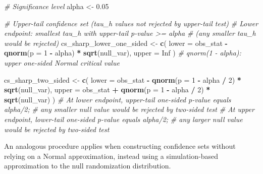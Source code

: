 \documentclass[
  12pt,
  leqno]{article}
\newenvironment{Shaded}{\begin{snugshade}}{\end{snugshade}}
\newcommand{\AttributeTok}[1]{\textcolor[rgb]{0.13,0.29,0.53}{#1}}
\newcommand{\CommentTok}[1]{\textcolor[rgb]{0.56,0.35,0.01}{\textit{#1}}}
\newcommand{\ConstantTok}[1]{\textcolor[rgb]{0.56,0.35,0.01}{#1}}
\newcommand{\DecValTok}[1]{\textcolor[rgb]{0.00,0.00,0.81}{#1}}
\newcommand{\FloatTok}[1]{\textcolor[rgb]{0.00,0.00,0.81}{#1}}
\newcommand{\FunctionTok}[1]{\textcolor[rgb]{0.13,0.29,0.53}{\textbf{#1}}}
\newcommand{\NormalTok}[1]{#1}
\newcommand{\OtherTok}[1]{\textcolor[rgb]{0.56,0.35,0.01}{#1}}
\newcommand{\SpecialCharTok}[1]{\textcolor[rgb]{0.81,0.36,0.00}{\textbf{#1}}}
\begin{document}
\singlespacing

\begin{Shaded}
\begin{Highlighting}[]
\CommentTok{\# Significance level}
\NormalTok{alpha }\OtherTok{\textless{}{-}} \FloatTok{0.05}

\CommentTok{\# Upper{-}tail confidence set (tau\_h values not rejected by upper{-}tail test)}
\CommentTok{\# Lower endpoint: smallest tau\_h with upper{-}tail p{-}value \textgreater{}= alpha}
\CommentTok{\# (any smaller tau\_h would be rejected)}
\NormalTok{cs\_sharp\_lower\_one\_sided }\OtherTok{\textless{}{-}} \FunctionTok{c}\NormalTok{(}
  \AttributeTok{lower =}\NormalTok{ obs\_stat }\SpecialCharTok{{-}} \FunctionTok{qnorm}\NormalTok{(}\AttributeTok{p =} \DecValTok{1} \SpecialCharTok{{-}}\NormalTok{ alpha) }\SpecialCharTok{*} \FunctionTok{sqrt}\NormalTok{(null\_var),}
  \AttributeTok{upper =} \ConstantTok{Inf}
\NormalTok{)}
\CommentTok{\# qnorm(1 {-} alpha): upper one{-}sided Normal critical value}

\NormalTok{cs\_sharp\_two\_sided }\OtherTok{\textless{}{-}} \FunctionTok{c}\NormalTok{(}
  \AttributeTok{lower =}\NormalTok{ obs\_stat }\SpecialCharTok{{-}} \FunctionTok{qnorm}\NormalTok{(}\AttributeTok{p =} \DecValTok{1} \SpecialCharTok{{-}}\NormalTok{ alpha }\SpecialCharTok{/} \DecValTok{2}\NormalTok{) }\SpecialCharTok{*} \FunctionTok{sqrt}\NormalTok{(null\_var),}
  \AttributeTok{upper =}\NormalTok{ obs\_stat }\SpecialCharTok{+} \FunctionTok{qnorm}\NormalTok{(}\AttributeTok{p =} \DecValTok{1} \SpecialCharTok{{-}}\NormalTok{ alpha }\SpecialCharTok{/} \DecValTok{2}\NormalTok{) }\SpecialCharTok{*} \FunctionTok{sqrt}\NormalTok{(null\_var)}
\NormalTok{)}
\CommentTok{\# At lower endpoint, upper{-}tail one{-}sided p{-}value equals alpha/2;}
\CommentTok{\# any smaller null value would be rejected by two{-}sided test}
\CommentTok{\# At upper endpoint, lower{-}tail one{-}sided p{-}value equals alpha/2;}
\CommentTok{\# any larger null value would be rejected by two{-}sided test}
\end{Highlighting}
\end{Shaded}

\doublespacing

An analogous procedure applies when constructing confidence sets without
relying on a Normal approximation, instead using a simulation-based
approximation to the null randomization distribution.

\singlespacing
\end{document}
